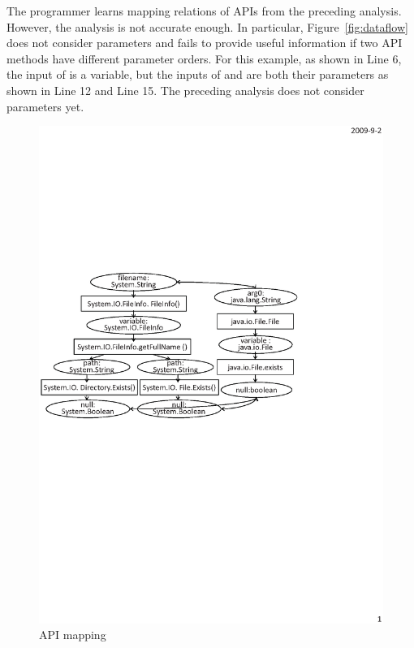 The programmer learns mapping relations of APIs from the preceding
analysis. However, the analysis is not accurate enough. In
particular, Figure~\ref{fig:dataflow} does not consider parameters
and fails to provide useful information if two API methods have
different parameter orders. For this example, as shown in Line 6,
the input of  is a variable, but the
inputs of  and
 are both their parameters as shown
in Line 12 and Line 15. The preceding analysis does not consider
parameters yet.
\begin{figure}[t]
\centering
\includegraphics[scale=0.65,clip]{figure/sample.eps}\vspace*{-3ex}
 \caption
{\label{fig:example}API mapping}\vspace*{-3ex}
\end{figure}


